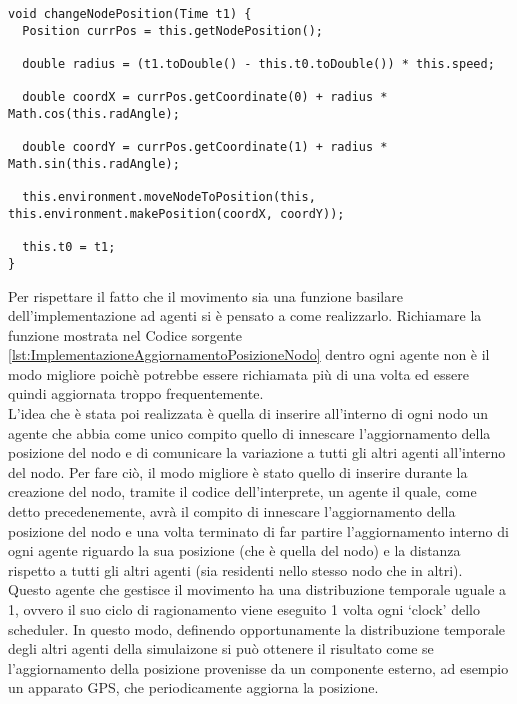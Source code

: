 \medskip
\begin{lstlisting}[firstnumber=1,label={lst:ImplementazioneAggiornamentoPosizioneNodo},caption={Implementazione aggiornamento posizione nodo}]
void changeNodePosition(Time t1) {
  Position currPos = this.getNodePosition();
  
  double radius = (t1.toDouble() - this.t0.toDouble()) * this.speed;
  
  double coordX = currPos.getCoordinate(0) + radius * Math.cos(this.radAngle);
  
  double coordY = currPos.getCoordinate(1) + radius * Math.sin(this.radAngle);
  
  this.environment.moveNodeToPosition(this, this.environment.makePosition(coordX, coordY));
  
  this.t0 = t1;
}
\end{lstlisting}

Per rispettare il fatto che il movimento sia una funzione basilare dell'implementazione ad agenti si è pensato a come realizzarlo. Richiamare la funzione mostrata nel Codice sorgente \ref{lst:ImplementazioneAggiornamentoPosizioneNodo} dentro ogni agente non è il modo migliore poichè potrebbe essere richiamata più di una volta ed essere quindi aggiornata troppo frequentemente.
\\
L'idea che è stata poi realizzata è quella di inserire all'interno di ogni nodo un agente che abbia come unico compito quello di innescare l'aggiornamento della posizione del nodo e di comunicare la variazione a tutti gli altri agenti all'interno del nodo. Per fare ciò, il modo migliore è stato quello di inserire durante la creazione del nodo, tramite il codice dell'interprete, un agente il quale, come detto precedenemente, avrà il compito di innescare l'aggiornamento della posizione del nodo e una volta terminato di far partire l'aggiornamento interno di ogni agente riguardo la sua posizione (che è quella del nodo) e la distanza rispetto a tutti gli altri agenti (sia residenti nello stesso nodo che in altri).
\\
Questo agente che gestisce il movimento ha una distribuzione temporale uguale a 1, ovvero il suo ciclo di ragionamento viene eseguito 1 volta ogni `clock' dello scheduler. In questo modo, definendo opportunamente la distribuzione temporale degli altri agenti della simulaizone si può ottenere il risultato come se l'aggiornamento della posizione provenisse da un componente esterno, ad esempio un apparato GPS, che periodicamente aggiorna la posizione.

